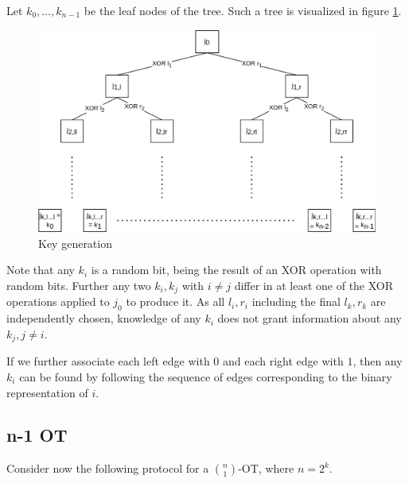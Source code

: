 \documentclass[a4paper]{scrreprt}
\begin{document}
Let $k_0, \ldots, k_{n-1}$ be the leaf nodes of the tree. Such a tree is
visualized in figure \ref{fig:keygen}.

\begin{figure}[h]
        \centering
		\includegraphics[width=\textwidth]{resources/key_generation}
		\caption{Key generation}
		\label{fig:keygen}
\end{figure}

Note that any $k_i$ is a random bit, being the result of an XOR operation with
random bits. Further any two $k_i, k_j$ with $i \neq j$ differ in at least one
of the XOR operations applied to $j_0$ to produce it. As all $l_i, r_i$
including the final $l_k, r_k$ are independently chosen, knowledge of any $k_i$
does not grant information about any $k_j, j \neq i$.

If we further associate each left edge with $0$ and each right edge with $1$,
then any $k_i$ can be found by following the sequence of edges corresponding to
the binary representation of $i$.

\subsection{n-1 OT}

Consider now the following protocol for a $\binom{n}{1}$-OT, where $n = 2^k$.
\end{document}
